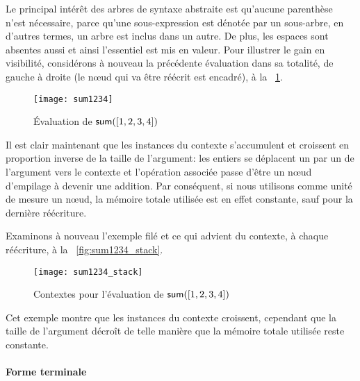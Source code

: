 Le principal intérêt des arbres de syntaxe abstraite est qu'aucune
parenthèse n'est nécessaire, parce qu'une sous-expression est dénotée
par un sous-arbre, en d'autres termes, un arbre est inclus dans un
autre. De plus, les espaces sont absentes aussi et ainsi l'essentiel
est mis en valeur. Pour illustrer le gain en visibilité, considérons à
nouveau la précédente évaluation dans sa totalité, de gauche à droite
(le n{\oe}ud qui va être réécrit est encadré), à la
\fig~\ref{fig:sum1234}.
\begin{figure}
\centering
\texttt{[image: sum1234]}
\caption{Évaluation de \(\textsf{sum}([1,2,3,4])\)}
\label{fig:sum1234}
\end{figure}
Il est clair maintenant que les instances du contexte s'accumulent et
croissent en proportion inverse de la taille de l'argument: les
entiers se déplacent un par un de l'argument vers le contexte et
l'opération associée passe d'être un n{\oe}ud
d'empilage à devenir une addition. Par
conséquent, si nous utilisons comme unité de mesure un n{\oe}ud, la
mémoire totale utilisée est en effet constante, sauf pour la dernière
réécriture.

Examinons à nouveau l'exemple filé et ce qui advient du contexte, à
chaque réécriture, à la \fig~\vref{fig:sum1234_stack}.
\begin{figure}
\centering
\texttt{[image: sum1234\_stack]}
\caption{Contextes pour l'évaluation de \(\textsf{sum}([1,2,3,4])\)}
\label{fig:sum1234_stack}
\end{figure}
Cet exemple montre que les instances du contexte croissent, cependant
que la taille de l'argument décroît de telle manière que la mémoire
totale utilisée reste constante.



\paragraph{Forme terminale}
\label{sec:tail}

